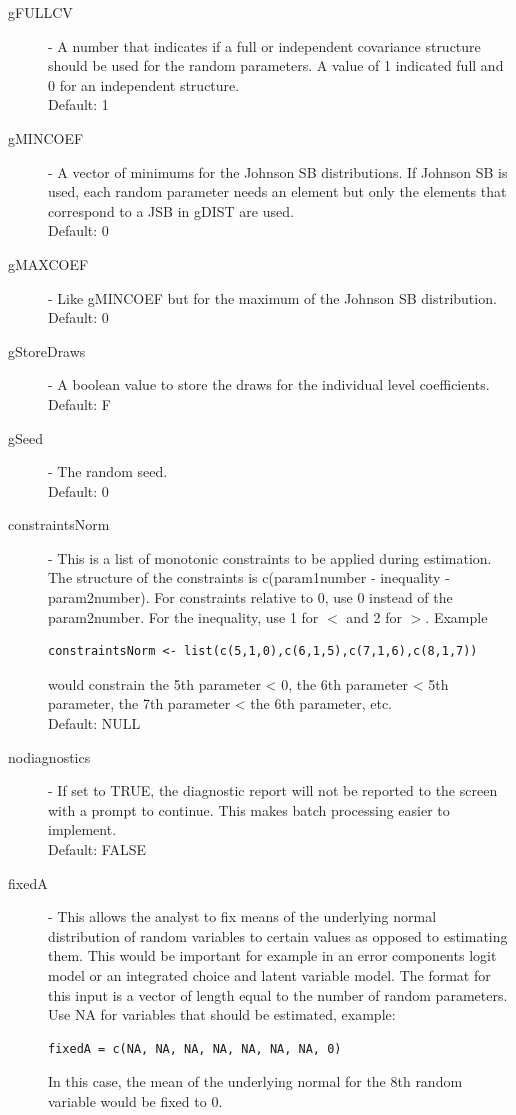 \documentclass{article}
\begin{document}
\begin{description}
\item[gFULLCV] - A number that indicates if a full or independent covariance structure should be used for the random parameters. A value of 1 indicated full and 0 for an independent structure.\\ Default: 1

\item[gMINCOEF] - A vector of minimums for the Johnson SB distributions. If Johnson SB is used, each random parameter needs an element but only the elements that correspond to a JSB in gDIST are used. \\ 
Default: 0

\item[gMAXCOEF] - Like gMINCOEF but for the maximum of the Johnson SB distribution. 
\\ Default: 0

\item[gStoreDraws] - A boolean value to store the draws for the individual level coefficients. \\ Default: F

\item[gSeed] - The random seed.\\ 
Default: 0

\item[constraintsNorm] - This is a list of monotonic constraints to be applied during estimation. The structure of the constraints is c(param1number - inequality - param2number). For constraints relative to 0, use 0 instead of the param2number. For the inequality, use 1 for $<$ and 2 for $>$. Example \begin{verbatim}constraintsNorm <- list(c(5,1,0),c(6,1,5),c(7,1,6),c(8,1,7))\end{verbatim} would constrain the 5th parameter < 0, the 6th parameter < 5th parameter, the 7th parameter < the 6th parameter, etc. \\ Default: NULL

\item[nodiagnostics] - If set to TRUE, the diagnostic report will not be reported to the screen with a prompt to continue. This makes batch processing easier to implement.\\ 
Default: FALSE

\item[fixedA] - This allows the analyst to fix means of the underlying normal distribution of random variables to certain values as opposed to estimating them. This would be important for example in an error components logit model or an integrated choice and latent variable model. The format for this input is a vector of length equal to the number of random parameters. Use NA for variables that should be estimated, example: \begin{verbatim}fixedA = c(NA, NA, NA, NA, NA, NA, NA, 0)\end{verbatim} In this case, the mean of the underlying normal for the 8th random variable would be fixed to 0.


\end{description}
\end{document}
